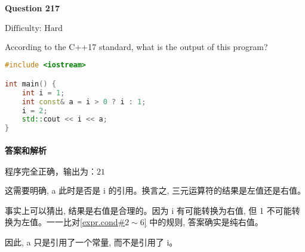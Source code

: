 \documentclass{article}
\begin{document}
	\paragraph*{Question 217} $\boxed{\text{Difficulty: Hard}} $			
	
	According to the C++17 standard, what is the output of this program?
	
	\begin{lstlisting}[language=C++]  		
#include <iostream>

int main() {
	int i = 1;
	int const& a = i > 0 ? i : 1;
	i = 2;
	std::cout << i << a;
}
	\end{lstlisting}
	
	\paragraph*{答案和解析} $\boxed{\text{程序完全正确，输出为：21}} $
	
	这需要明确, a 此时是否是 i 的引用。换言之, 三元运算符的结果是左值还是右值。
	
	事实上可以猜出, 结果是右值是合理的。因为 i 有可能转换为右值, 但 1 不可能转换为左值。一一比对\href{https://timsong-cpp.github.io/cppwp/n4659/expr.cond}{[expr.cond\#$2\sim6$]} 中的规则, 答案确实是纯右值。
	
	因此, a 只是引用了一个常量, 而不是引用了 i。
\end{document}
